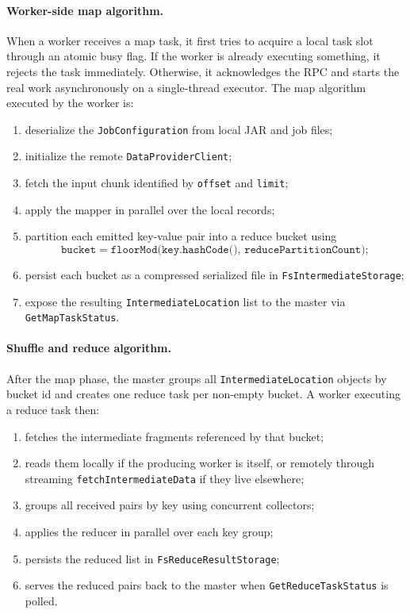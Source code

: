 \documentclass{scrartcl}
\begin{document}
\paragraph{Worker-side map algorithm.}
When a worker receives a map task, it first tries to acquire a local task slot through an atomic busy flag. If the worker is already executing something, it rejects the task immediately. Otherwise, it acknowledges the RPC and starts the real work asynchronously on a single-thread executor. The map algorithm executed by the worker is:
%
\begin{enumerate}
    \item deserialize the \texttt{JobConfiguration} from local JAR and job files;
    \item initialize the remote \texttt{DataProviderClient};
    \item fetch the input chunk identified by \texttt{offset} and \texttt{limit};
    \item apply the mapper in parallel over the local records;
    \item partition each emitted key-value pair into a reduce bucket using
          \[
              \texttt{bucket} = \texttt{floorMod(key.hashCode(), reducePartitionCount)};
          \]
    \item persist each bucket as a compressed serialized file in \texttt{FsIntermediateStorage};
    \item expose the resulting \texttt{IntermediateLocation} list to the master via \texttt{GetMapTaskStatus}.
\end{enumerate}

\paragraph{Shuffle and reduce algorithm.}
After the map phase, the master groups all \texttt{IntermediateLocation} objects by bucket id and creates one reduce task per non-empty bucket. A worker executing a reduce task then:
%
\begin{enumerate}
    \item fetches the intermediate fragments referenced by that bucket;
    \item reads them locally if the producing worker is itself, or remotely through streaming \texttt{fetchIntermediateData} if they live elsewhere;
    \item groups all received pairs by key using concurrent collectors;
    \item applies the reducer in parallel over each key group;
    \item persists the reduced list in \texttt{FsReduceResultStorage};
    \item serves the reduced pairs back to the master when \texttt{GetReduceTaskStatus} is polled.
\end{enumerate}
\end{document}
